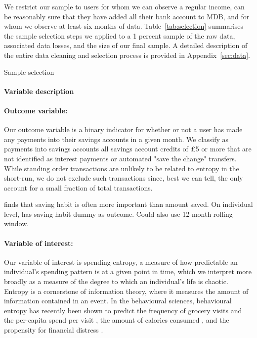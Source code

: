 We restrict our sample to users for whom we can observe a regular income, can
be reasonably sure that they have added all their bank account to MDB, and for
whom we observe at least six months of data. Table~\ref{tab:selection}
summarises the sample selection steps we applied to a 1 percent sample of the
raw data, associated data losses, and the size of our final sample. A detailed
description of the entire data cleaning and selection process is provided in
Appendix~\ref{sec:data}.

\begin{table}[H]
\caption{Sample selection}\label{tab:selection}

\end{table}

\paragraph{Variable description}%
\label{par:dependent_variable}

\paragraph{Outcome variable:}%
\label{par:outcome_variable_}
Our outcome variable is a binary indicator for whether or not a user has made
any payments into their savings accounts in a given month. We classify as
payments into savings accounts all savings account credits of \pounds5 or more
that are not identified as interest payments or automated "save the change"
transfers. While standing order transactions are unlikely to be related to
entropy in the short-run, we do not exclude such transactions since, best we
can tell, the only account for a small fraction of total transactions.


\citet{mps2018building} finds that saving habit is often more important than
amount saved. On individual level, has saving habit dummy as outcome. Could
also use 12-month rolling window.




\paragraph{Variable of interest:}%
\label{par:variable_of_interest_}
Our variable of interest is spending entropy, a measure of how predictable an
individual's spending pattern is at a given point in time, which we interpret
more broadly as a measure of the degree to which an individual's life is
chaotic. Entropy is a cornerstone of information theory, where it measures the
amount of information contained in an event. In the behavioural sciences,
behavioural entropy has recently been shown to predict the frequency of grocery
visits and the per-capita spend per visit \citep{guidotti2015behavioral}, the
amount of calories consumed \citep{skatova2019those}, and the propensity for
financial distress \citep{muggleton2020evidence}.

